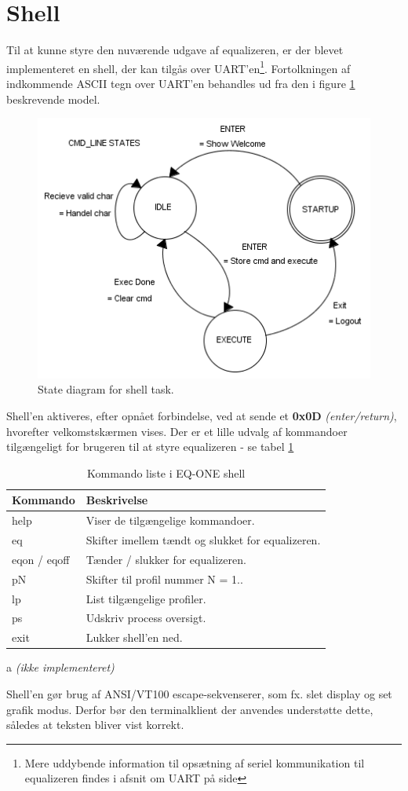\section{Shell}
Til at kunne styre den nuværende udgave af equalizeren, er der blevet implementeret en shell, der kan tilgås over UART'en\footnote{Mere uddybende information til opsætning af seriel kommunikation til equalizeren findes i afsnit om UART på side \pageref{subsec:uart}}.
Fortolkningen af indkommende ASCII tegn over UART'en behandles ud fra den i figure \ref{fig:shell_task} beskrevende model.

\begin{figure}[h!]
	\centering
	\includegraphics[width=.6\textwidth]{billeder/cmd_states.png}
	\caption{State diagram for shell task.}
	\label{fig:shell_task}
\end{figure}

Shell'en aktiveres, efter opnået forbindelse, ved at sende et \textbf{0x0D} \textit{(enter/return)}, hvorefter velkomstskærmen vises.
Der er et lille udvalg af kommandoer tilgængeligt for brugeren til at styre equalizeren - se tabel \ref{tab:shell_cmd} 

\begin{table}[h!]
	\caption{Kommando liste i EQ-ONE shell}
	\label{tab:shell_cmd}
	\begin{threeparttable}
		\begin{tabular}{l p{}}
			\toprule
			\textbf{Kommando}      & \textbf{Beskrivelse}   \\ 
			\midrule
			help		& Viser de tilgængelige kommandoer. \\
			eq       	& Skifter imellem tændt og slukket for equalizeren. \\
			eqon / eqoff & Tænder / slukker for equalizeren. \tnote{a}\\
			pN			& Skifter til profil nummer N = 1.. \\
			lp			& List tilgængelige profiler.\tnote{a}\\
			ps		    & Udskriv process oversigt. \\
			exit 		& Lukker shell'en ned. \\
			\bottomrule
		\end{tabular}
		
		\begin{tablenotes}
			\item[a] \textit{(ikke implementeret)}
		\end{tablenotes}
	\end{threeparttable}
\end{table}

Shell'en gør brug af ANSI/VT100 escape-sekvenserer, som fx. slet display og set grafik modus.
Derfor bør den terminalklient der anvendes understøtte dette, således at teksten bliver vist korrekt.







